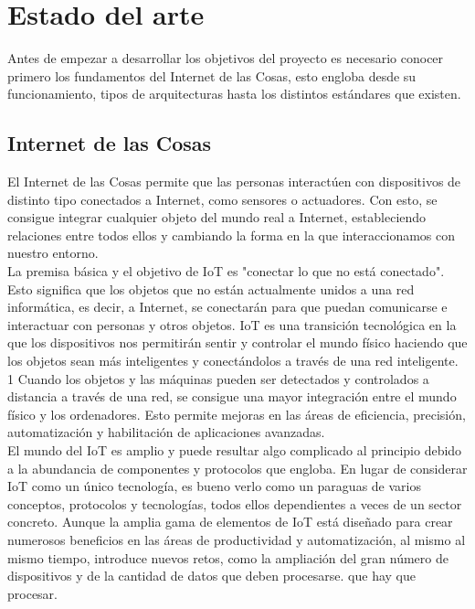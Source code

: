 \chapter{Estado del arte}

{\color{blue}

Antes de empezar a desarrollar los objetivos del proyecto es necesario conocer primero los fundamentos del Internet de las Cosas, esto engloba desde su funcionamiento, tipos de arquitecturas hasta los distintos estándares que existen. %

\section{Internet de las Cosas}

El Internet de las Cosas %
permite que las personas
interactúen con dispositivos de distinto tipo conectados a Internet, como sensores o actuadores. Con
esto, se consigue integrar cualquier objeto del mundo real a Internet, estableciendo relaciones entre
todos ellos y cambiando la forma en la que interaccionamos con nuestro entorno. \\

La premisa básica y el objetivo de IoT es "conectar lo que no está conectado". Esto significa que los objetos que no están actualmente unidos a una red informática, es decir, a Internet, se conectarán para que puedan comunicarse e interactuar con personas y otros objetos. IoT es una transición tecnológica en la que los dispositivos nos permitirán sentir y controlar el mundo físico haciendo que los objetos sean más inteligentes y conectándolos a través de una red inteligente. 1 Cuando los objetos y las máquinas pueden ser detectados y controlados a distancia a través de una red, se consigue una mayor integración entre el mundo físico y los ordenadores. Esto permite mejoras en las áreas de eficiencia, precisión, automatización y habilitación de aplicaciones avanzadas. \\

El mundo del IoT es amplio y puede resultar algo complicado al principio debido a la abundancia de componentes y protocolos que engloba. En lugar de considerar IoT como un único tecnología, es bueno verlo como un paraguas de varios conceptos, protocolos y tecnologías, todos ellos dependientes a veces de un sector concreto. Aunque la amplia gama de elementos de IoT está diseñado para crear numerosos beneficios en las áreas de productividad y automatización, al mismo al mismo tiempo, introduce nuevos retos, como la ampliación del gran número de dispositivos y de la cantidad de datos que deben procesarse. que hay que procesar. \cite{hanes2017iot}

}